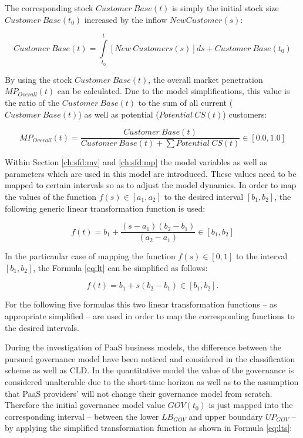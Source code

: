 The corresponding stock $Customer~Base(t)$ is simply the initial stock size $\mathit{Customer~Base(t_0)}$ increased by the inflow $New Customer(s)$:

\begin{equation}\label{eq:cb}
	\mathit{Customer~Base(t)} = \int\limits_{t_0}^t \mathit{[New~Customers(s)]ds} + \mathit{Customer~Base(t_0)}
\end{equation}

By using the stock $Customer~Base(t)$, the overall market penetration $MP_{Overall}(t)$ can be calculated. Due to the model simplifications, this value is the ratio of the $Customer~Base(t)$ to the sum of all current \linebreak ($Customer~Base(t)$) as well as potential ($Potential~CS(t)$) customers:

\begin{equation}\label{eq:mpo}
	MP_{Overall}(t) = \frac{\mathit{Customer~Base(t)}}{\mathit{Customer~Base(t)} + \sum \mathit{Potential~CS(t)}} \in [0.0,1.0]
\end{equation}

Within Section \ref{ch:sfd:mv} and \ref{ch:sfd:mp} the model variables as well as parameters which are used in this model are introduced. These values need to be mapped to certain intervals so as to adjust the model dynamics. In order to map the values of the function $f(s) \in [a_1,a_2]$ to the desired interval $[b_1,b_2]$, the following generic linear transformation function is used:

\begin{equation}\label{eq:lt}
	f(t) = b_{1} + \frac{(s-a_1)(b_2-b_1)}{(a_2-a_1)} \in [b_1,b_2]
\end{equation}

In the particaular case of mapping the function $f(s) \in [0,1]$ to the interval $[b_1,b_2]$, the Formula \ref{eq:lt} can be simplified as follows:

\begin{equation}\label{eq:lts}
	f(t) = b_{1} + s (b_{2}-b_{1}) \in [b_{1},b_{2}].
\end{equation}

For the following five formulas this two linear transformation functions -- as appropriate simplified -- are used in order to map the corresponding functions to the desired intervals.

During the investigation of \ac{PaaS} business models, the difference between the pursued governance model have been noticed and considered in the classification scheme as well as \ac{CLD}. In the quantitative model the value of the governance is considered unalterable due to the short-time horizon as well as to the assumption that \ac{PaaS} providers' will not change their governance model from scratch. Therefore the initial governance model value $GOV(t_0)$ is just mapped into the corresponding interval -- between the lower $LB_{GOV}$ and upper boundary $UP_{GOV}$ -- by applying the simplified transformation function as shown in Formula \ref{eq:lts}:

